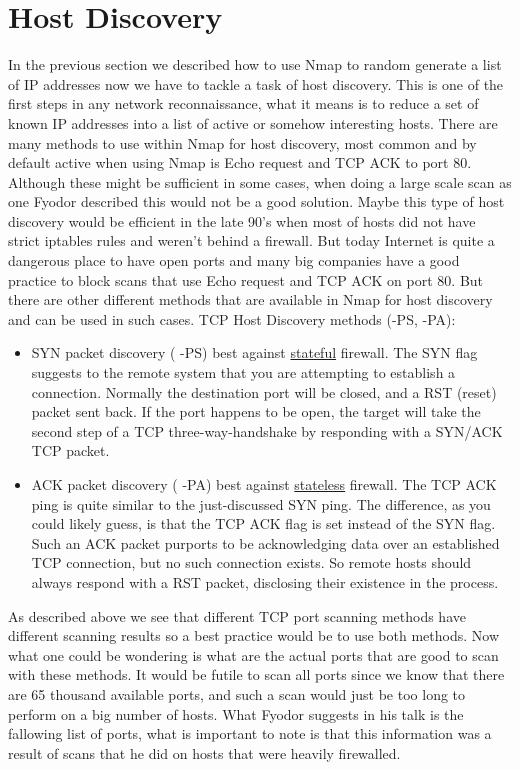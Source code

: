 \documentclass[times, utf8, seminar,english]{fer}
\begin{document}
\section{Host Discovery}
In the previous section we described how to use Nmap to random generate a list of IP addresses now we have to tackle a task of host discovery. This is one of the first steps in any network reconnaissance, what it means is to reduce a set of known IP addresses into a list of active or somehow interesting hosts. There are many methods to use within Nmap for host discovery, most common and by default active when using Nmap is Echo request and TCP ACK to port 80. Although these might be sufficient in some cases, when doing a large scale scan as one Fyodor described this would not be a good solution. Maybe this type of host discovery would be efficient in the late 90's when most of hosts did not have strict iptables rules and weren't behind a firewall. But today Internet is quite a dangerous place to have open ports and many big companies have a good practice to block scans that use Echo request and TCP ACK on port 80. But there are other different methods that are available in Nmap for host discovery and can be used in such cases. 
\newline\newline TCP Host Discovery methods (-PS, -PA):
\begin{itemize}
	\item SYN packet discovery ( -PS) best against \underline{stateful} firewall. The SYN flag suggests to the remote system that you are attempting to establish a connection. Normally the destination port will be closed, and a RST (reset) packet sent back. If the port happens to be open, the target will take the second step of a TCP three-way-handshake by responding with a SYN/ACK TCP packet.
	\item ACK packet discovery ( -PA) best against \underline{stateless} firewall. The TCP ACK ping is quite similar to the just-discussed SYN ping. The difference, as you could likely guess, is that the TCP ACK flag is set instead of the SYN flag. Such an ACK packet purports to be acknowledging data over an established TCP connection, but no such connection exists. So remote hosts should always respond with a RST packet, disclosing their existence in the process.
\end{itemize}
As described above we see that different TCP port scanning methods have different scanning results so a best practice would be to use both methods. Now what one could be wondering is what are the actual ports that are good to scan with these methods. It would be futile to scan all ports since we know that there are 65 thousand available ports, and such a scan would just be too long to perform on a big number of hosts. What Fyodor suggests in his talk is the fallowing list of ports, what is important to note is that this information was a result of scans that he did on hosts that were heavily firewalled.
\end{document}

